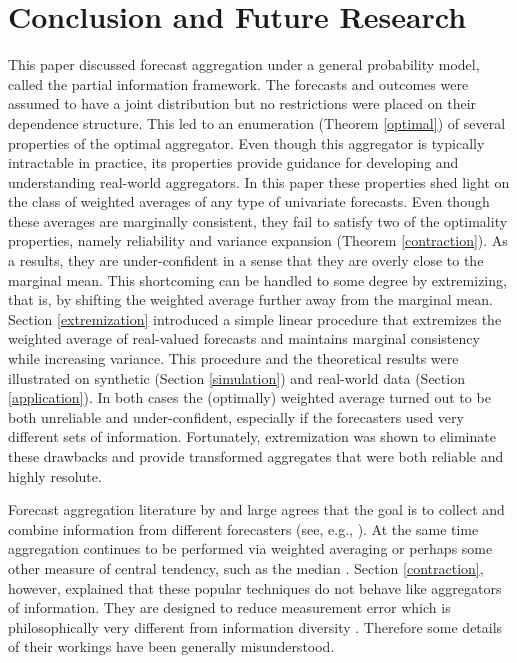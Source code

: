 \documentclass[11pt]{article}
\theoremstyle{definition}
\theoremstyle{definition}
\begin{document}
\section{Conclusion and Future Research} \label{conclusion}

This paper discussed forecast aggregation under a general probability model, called the partial information framework. The forecasts and outcomes were assumed to have a joint distribution but no restrictions were placed on their dependence structure. This led to an enumeration (Theorem \ref{optimal}) of several properties of the optimal aggregator. Even though this aggregator is typically intractable in practice, its properties provide guidance for developing and understanding real-world aggregators. In this paper these properties shed light on the class of weighted averages of any type of univariate forecasts. Even though these averages are marginally consistent, they fail to satisfy two of the optimality properties, namely reliability and variance expansion (Theorem \ref{contraction}). As a results, they are under-confident in a sense that they are overly close to the marginal mean. This shortcoming can be handled to some degree by extremizing, that is, by shifting the weighted average further away from the marginal mean.  Section \ref{extremization} introduced a simple linear procedure that extremizes the weighted average of real-valued forecasts and maintains marginal consistency while increasing variance. This procedure and the theoretical results were illustrated on synthetic (Section \ref{simulation}) and real-world data (Section \ref{application}). In both cases the (optimally) weighted average turned out to be both unreliable and under-confident, especially if the forecasters used very different sets of information. Fortunately, extremization was shown to eliminate these drawbacks and provide transformed aggregates that were both reliable and highly resolute. 

Forecast aggregation literature by and large agrees that the goal is to collect and combine  information from different forecasters (see, e.g., \citealt{forlines2012heuristics, armstrong2, dawid1995coherent}). At the same time aggregation continues to be performed via weighted averaging or perhaps some other measure of central tendency, such as the median \citep{armstrong2, levins1966strategy, lobo2010human}. Section \ref{contraction}, however, explained that these popular techniques do not behave like aggregators of information. They are designed to reduce measurement error which is philosophically very different from information diversity \citep{satopaamodeling2}. Therefore some details of their workings have been generally misunderstood.
\end{document}
